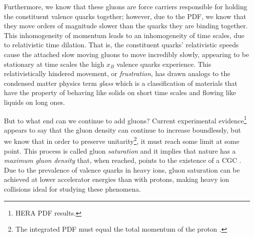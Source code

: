 Furthermore, we know that these gluons are force carriers responsible for holding the constituent valence quarks together; however, due to the PDF, we know that they move orders of magnitude slower than the quarks they are binding together. This inhomogeneity of momentum leads to an inhomogeneity of time scales, due to relativistic time dilation. That is, the constituent quarks' relativistic speeds cause the attached slow moving gluons to move incredibly slowly, appearing to be stationary at time scales the high $x_{B}$ valence quarks experience. This relativistically hindered movement, or \textit{frustration}, has drawn analogs to the condensed matter physics term \textit{glass} which is a classification of materials that have the property of behaving like solids on short time scales and flowing like liquids on long ones. 

But to what end can we continue to add gluons? Current experimental evidence\footnote{HERA PDF results.} appears to say that the gluon density can continue to increase boundlessly, but we know that in order to preserve unitarity\footnote{The integrated PDF must equal the total momentum of the proton \citep{HemmickRHIClecture}.}, it must reach some limit at some point. This process is called gluon \textit{saturation} and it implies that nature has a \textit{maximum gluon density} that, when reached, points to the existence of a CGC \citep{HemmickRHIClecture}. Due to the prevalence of valence quarks in heavy ions, gluon saturation can be achieved at lower accelerator energies than with protons, making heavy ion collisions ideal for studying these phenomena.

